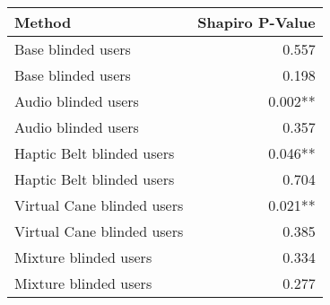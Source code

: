 
\centering
\begin{tabular}{lr}
\toprule
                    Method & Shapiro P-Value \\
\midrule
        Base blinded users &           0.557 \\
        Base blinded users &           0.198 \\
       Audio blinded users &         0.002** \\
       Audio blinded users &           0.357 \\
 Haptic Belt blinded users &         0.046** \\
 Haptic Belt blinded users &           0.704 \\
Virtual Cane blinded users &         0.021** \\
Virtual Cane blinded users &           0.385 \\
     Mixture blinded users &           0.334 \\
     Mixture blinded users &           0.277 \\
\bottomrule
\end{tabular}
